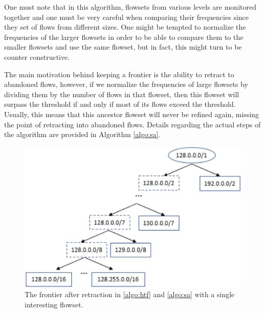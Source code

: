 One must note that in this algorithm, flowsets from various levels are monitored together and one must be very careful when comparing their frequencies since they set of flows from different sizes. One might be tempted to normalize the frequencies of the larger flowsets in order to be able to compare them to the smaller flowsets and use the same flowset, but in fact, this might turn to be counter constructive.

The main motivation behind keeping a frontier is the ability to retract to abandoned flows, however, if we normalize the frequencies of large flowsets by dividing them by the number of flows in that flowset, then this flowset will surpass the threshold if and only if most of its flows exceed the threshold. Usually, this means that this ancestor flowset will never be refined again, missing the point of retracting into abandoned flows. Details regarding the actual steps of the algorithm are provided in Algorithm \ref{algo:sa}.

\begin{figure}
	\centering
	\includegraphics[width=\linewidth]{HHH/jpg_figures/sa_vs_htf.JPG}
\caption[An example of a frontier after retraction in \ref{algo:htf} and \ref{algo:sa} algorithms]{The frontier after retraction in \ref{algo:htf} and \ref{algo:sa} with a single interesting flowset.}
\label{fig:sa_vs_htf}
\end{figure}

